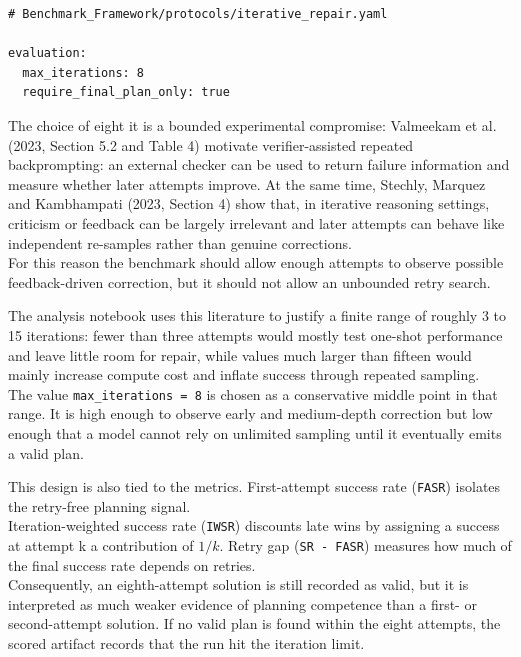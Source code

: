 \begin{lstlisting}[caption={Iteration budget in the iterative-repair protocol.}, label={lst:iterative_repair_iteration_budget}]
# Benchmark_Framework/protocols/iterative_repair.yaml

evaluation:
  max_iterations: 8
  require_final_plan_only: true
\end{lstlisting}

The choice of eight it is a bounded experimental compromise: Valmeekam et al.
(2023, Section 5.2 and Table 4) motivate verifier-assisted repeated
backprompting: an external checker can be used to return failure information and
measure whether later attempts improve. At the same time, Stechly, Marquez and
Kambhampati (2023, Section 4) show that, in iterative reasoning settings,
criticism or feedback can be largely irrelevant and later attempts can behave
like independent re-samples rather than genuine corrections.\\
For this reason the benchmark should allow enough attempts to observe possible feedback-driven correction, but it should not allow an unbounded retry search.

The analysis notebook uses this literature to justify a finite range of roughly 3 to 15 iterations: fewer than three attempts would mostly test one-shot performance and leave little room for repair, while values much larger than fifteen would mainly increase compute cost and inflate success through repeated sampling.\\
The value \texttt{max\_iterations = 8} is chosen as a conservative middle point in that range. It is high enough to observe early and medium-depth correction but low enough that a model cannot rely on unlimited sampling until it eventually emits a
valid plan.

This design is also tied to the metrics. First-attempt success rate
(\texttt{FASR}) isolates the retry-free planning signal.\\
Iteration-weighted success rate (\texttt{IWSR}) discounts late wins by assigning a success at attempt k a contribution of \(1/k\). Retry gap (\texttt{SR - FASR}) measures how much of the final success rate depends on retries.\\ 
Consequently, an eighth-attempt solution is still recorded as valid, but it is interpreted as much weaker evidence of planning competence than a first- or second-attempt solution. If no valid plan is found within the eight attempts, the scored artifact records that the run hit the iteration limit.


